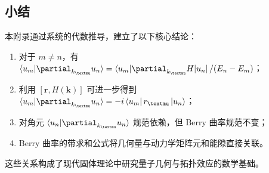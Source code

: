 \subsection{小结}
本附录通过系统的代数推导，建立了以下核心结论：
\begin{enumerate}
    \item 对于 \(m \neq n\)，有 \(\braket{u_m|\partial_{k_\mu}u_n} = \bra{u_m|\partial_{k_\mu}H|u_n}/(E_n-E_m)\)；
    \item 利用 \([\mathbf{r}, H(\mathbf{k})]\) 可进一步得到 \(\braket{u_m|\partial_{k_\mu}u_n} = -i\bra{u_m}r_\mu\ket{u_n}\)；
    \item 对角元 \(\braket{u_n|\partial_{k_\mu}u_n}\) 规范依赖，但 Berry 曲率规范不变；
    \item Berry 曲率的带求和公式将几何量与动力学矩阵元和能隙直接关联。
\end{enumerate}
这些关系构成了现代固体理论中研究量子几何与拓扑效应的数学基础。




